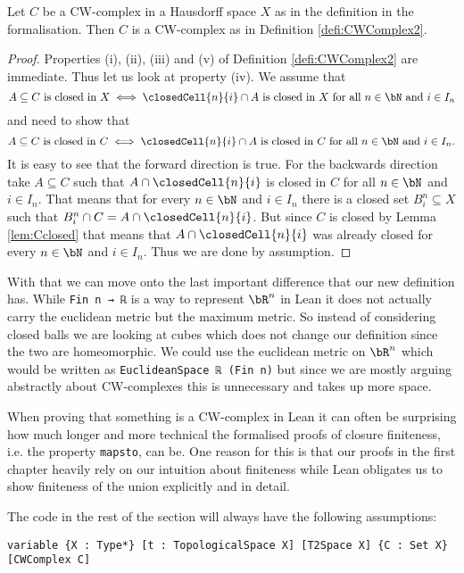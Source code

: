 \begin{lem}
  Let $C$ be a CW-complex in a Hausdorff space $X$ as in the definition in the formalisation.
  Then $C$ is a CW-complex as in Definition \ref{defi:CWComplex2}.
\end{lem}
\begin{proof}
  Properties (i), (ii), (iii) and (v) of Definition \ref{defi:CWComplex2} are immediate.
  Thus let us look at property (iv).
  We assume that
  \[A \subseteq C \text{ is closed in } X \iff \closedCell{n}{i} \cap A \text{ is closed in } X \text{ for all } n \in \bN \text{ and } i \in I_n\]
  and need to show that
  \[A \subseteq C \text{ is closed in } C \iff \closedCell{n}{i} \cap A \text{ is closed in } C \text{ for all } n \in \bN \text{ and } i \in I_n.\]
  It is easy to see that the forward direction is true.
  For the backwards direction take $A \subseteq C$ such that $A \cap \closedCell{n}{i}$ is closed in $C$ for all $n \in \bN$ and $i \in I_n$.
  That means that for every $n \in \bN$ and $i \in I_n$ there is a closed set $B_i^n \subseteq X$ such that $B^n_i \cap C = A \cap \closedCell{n}{i}$.
  But since $C$ is closed by Lemma \ref{lem:Cclosed} that means that $A \cap \closedCell{n}{i}$ was already closed for every $n \in \bN$ and $i \in I_n$.
  Thus we are done by assumption.
\end{proof}

With that we can move onto the last important difference that our new definition has.
While \lstinline{Fin n → ℝ} is a way to represent $\bR^n$ in Lean it does not actually carry the euclidean metric but the maximum metric.
So instead of considering closed balls we are looking at cubes which does not change our definition since the two are homeomorphic.
We could use the euclidean metric on $\bR^n$ which would be written as \lstinline{EuclideanSpace ℝ (Fin n)} but since we are mostly arguing abstractly about CW-complexes this is unnecessary and takes up more space.

When proving that something is a CW-complex in Lean it can often be surprising how much longer and more technical the formalised proofs of closure finiteness, i.e. the property \lstinline{mapsto}, can be. 
One reason for this is that our proofs in the first chapter heavily rely on our intuition about finiteness while Lean obligates us to show finiteness of the union explicitly and in detail.

The code in the rest of the section will always have the following assumptions:

\begin{lstlisting}
variable {X : Type*} [t : TopologicalSpace X] [T2Space X] {C : Set X} [CWComplex C]
\end{lstlisting}


